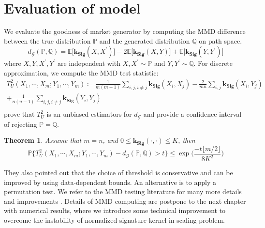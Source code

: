 \documentclass[12pt]{report}
\newtheorem{theorem}{Theorem}[chapter]
\theoremstyle{definition}
\theoremstyle{remark}
\newcommand{\E}{\mathbb{E}}
\renewcommand{\P}{\mathbb{P}}
\begin{document}
\section{Evaluation of model}
We evaluate the goodness of market generator by computing the MMD difference between the true distribution $\P$ and the generated distribution $\mathbb{Q}$ on path space. 
\begin{equation}
   d_{\mathcal{G}}(\P,\mathbb{Q}) = \E\big[\mathbf{k_{Sig}}(X,X^{\prime})\big] - 2\E\big[\mathbf{k_{Sig}}(X,Y)\big] + \E\big[\mathbf{k_{Sig}}(Y,Y^{\prime})\big]
\end{equation}
where $X,Y,X^{\prime},Y^{\prime}$ are independent with $X,X^{\prime}\sim\P$ and $Y,Y^{\prime}\sim\mathbb{Q}$. For discrete approximation, we compute the MMD
test statistic:
\begin{equation*}
  \begin{split}
    T^2_U(X_1, \cdots, X_m; Y_1,\cdots,Y_m) \coloneq \frac{1}{m(m-1)}\sum_{i,j,i\neq j} \mathbf{k_{Sig}}(X_{i},X_{j}) - \frac{2}{mn}\sum_{i,j} \mathbf{k_{Sig}}(X_{i},Y_{j})\\
    + \frac{1}{n(n-1)}\sum_{i,j,i\neq j} \mathbf{k_{Sig}}(Y_{i},Y_{j})\\
  \end{split}
\end{equation*}
\cite{gretton2012kernel, gretton2009fast} prove that $T^2_U$ is an unbiased estimators for $d_{\mathcal{G}}$ and provide a confidence interval of rejecting $\P = \mathbb{Q}$. 
\begin{theorem}
  Assume that $m = n$, and $0 \leq \mathbf{k_{Sig}}(\cdot,\cdot) \leq K$, then 
  \begin{equation*}
    \P\bigg\{T^2_U(X_1, \cdots, X_m; Y_1,\cdots,Y_m) - d_{\mathcal{G}}(\P,\mathbb{Q}) > t \bigg\} \leq \exp\Big(\frac{-t\lfloor m/2 \rfloor}{8K^{2}}\Big)
  \end{equation*}
\end{theorem}

They also pointed out that the choice of threshold is conservative and can be improved by using data-dependent bounds. An alternative is to apply a permutation test. We refer to the MMD testing literature for many more details and improvements \cite{gretton2012kernel, gretton2009fast, chwialkowski2016kernel, sejdinovic2013equivalence, jitkrittum2016interpretable, sriperumbudur2010hilbert}. Details of MMD computing are postpone to the next chapter with numerical results, where we introduce some technical improvement to overcome the instability of normalized signature kernel in scaling problem.
\end{document}
